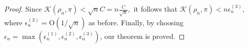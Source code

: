 \documentclass[11pt]{amsart}
\newcommand{\E}{\mathrm{E}}
\newcommand{\Var}{\mathrm{Var}}
\newcommand{\Cov}{\mathrm{Cov}}
\newcommand{\loglik}{r_n(\theta,\theta_0)}
\begin{document}
\begin{proof}
{%
}
Since
\(
    \mathcal{K}(\rho_n,\pi) <\sqrt{n}C = n \frac{C}{\sqrt{n}},
\)
it follows that
\(
    \mathcal{K}(\rho_n,\pi) <n \epsilon_n^{(3)},
\)
where $\epsilon_n^{(3)} = \mathrm{O}(1/\sqrt{n})$ as before. Finally, by choosing $\epsilon_n=\max(\epsilon_n^{(1)},\epsilon_n^{(2)},\epsilon_n^{(3)})$, our theorem is proved.
\end{proof}
\end{document}
